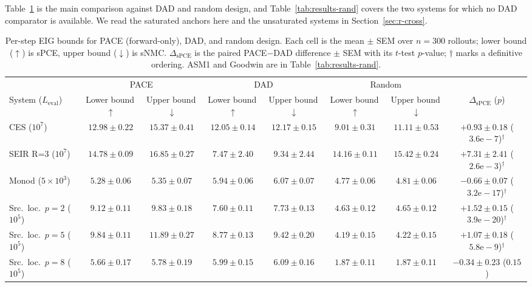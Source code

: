 Table~\ref{tab:results} is the main comparison against DAD and random design, and
Table~\ref{tab:results-rand} covers the two systems for which no DAD comparator is
available. We read the saturated anchors here and the unsaturated systems in
Section~\ref{sec:r-cross}.

\begin{table}[t]
\centering\footnotesize
\setlength{\tabcolsep}{4pt}
\caption[Per-step EIG bounds: PACE versus DAD and random]{Per-step EIG bounds for
PACE (forward-only), DAD, and random design. Each cell is the mean $\pm$ SEM over $n=300$
rollouts; lower bound ($\uparrow$) is sPCE, upper bound ($\downarrow$) is sNMC.
$\Delta_{\mathrm{sPCE}}$ is the paired PACE${-}$DAD difference $\pm$ SEM with its $t$-test
$p$-value; $\dagger$ marks a definitive ordering. ASM1 and Goodwin are in
Table~\ref{tab:results-rand}.}
\label{tab:results}
\begin{tabular}{lcccccc c}
\toprule
& \multicolumn{2}{c}{PACE} & \multicolumn{2}{c}{DAD} & \multicolumn{2}{c}{Random} & \\
\cmidrule(lr){2-3}\cmidrule(lr){4-5}\cmidrule(lr){6-7}
System ($L_{\mathrm{eval}}$) & Lower bound\,$\uparrow$ & Upper bound\,$\downarrow$ & Lower bound\,$\uparrow$ & Upper bound\,$\downarrow$ & Lower bound\,$\uparrow$ & Upper bound\,$\downarrow$ & $\Delta_{\mathrm{sPCE}}$ ($p$) \\
\midrule
CES ($10^7$)        & $12.98{\pm}0.22$ & $15.37{\pm}0.41$ & $12.05{\pm}0.14$ & $12.17{\pm}0.15$ & $9.01{\pm}0.31$ & $11.11{\pm}0.53$ & $+0.93{\pm}0.18$ ($3.6\mathrm{e}{-}7$)$^\dagger$ \\
SEIR R=3 ($10^7$)   & $14.78{\pm}0.09$ & $16.85{\pm}0.27$ & $7.47{\pm}2.40$ & $9.34{\pm}2.44$ & $14.16{\pm}0.11$ & $15.42{\pm}0.24$ & $+7.31{\pm}2.41$ ($2.6\mathrm{e}{-}3$)$^\dagger$ \\
Monod ($5{\times}10^3$) & $5.28{\pm}0.06$ & $5.35{\pm}0.07$ & $5.94{\pm}0.06$ & $6.07{\pm}0.07$ & $4.77{\pm}0.06$ & $4.81{\pm}0.06$ & $-0.66{\pm}0.07$ ($3.2\mathrm{e}{-}17$)$^\dagger$ \\
\midrule
Src.\ loc.\ $p{=}2$ ($10^5$) & $9.12{\pm}0.11$ & $9.83{\pm}0.18$ & $7.60{\pm}0.11$ & $7.73{\pm}0.13$ & $4.63{\pm}0.12$ & $4.65{\pm}0.12$ & $+1.52{\pm}0.15$ ($3.9\mathrm{e}{-}20$)$^\dagger$ \\
Src.\ loc.\ $p{=}5$ ($10^5$) & $9.84{\pm}0.11$ & $11.89{\pm}0.27$ & $8.77{\pm}0.13$ & $9.42{\pm}0.20$ & $4.19{\pm}0.15$ & $4.22{\pm}0.15$ & $+1.07{\pm}0.18$ ($5.8\mathrm{e}{-}9$)$^\dagger$ \\
Src.\ loc.\ $p{=}8$ ($10^5$) & $5.66{\pm}0.17$ & $5.78{\pm}0.19$ & $5.99{\pm}0.15$ & $6.09{\pm}0.16$ & $1.87{\pm}0.11$ & $1.87{\pm}0.11$ & $-0.34{\pm}0.23$ ($0.15$) \\

\end{tabular}
\end{table}
